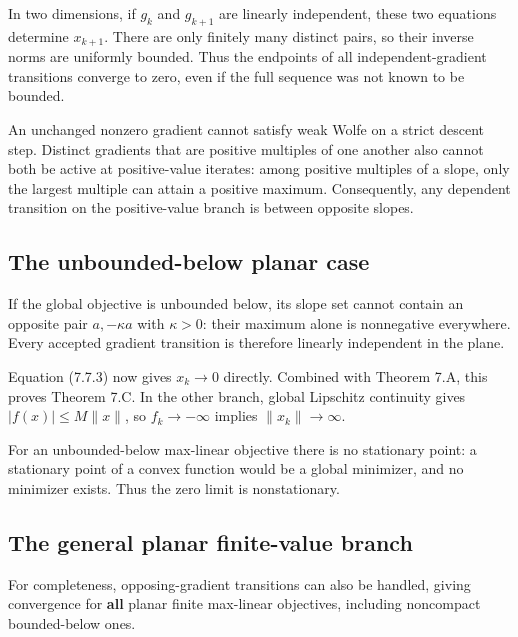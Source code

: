 In two dimensions, if \(g_k\) and \(g_{k+1}\) are linearly independent,
these two equations determine \(x_{k+1}\). There are only finitely many
distinct pairs, so their inverse norms are uniformly bounded. Thus the
endpoints of all independent-gradient transitions converge to zero, even
if the full sequence was not known to be bounded.

An unchanged nonzero gradient cannot satisfy weak Wolfe on a strict
descent step. Distinct gradients that are positive multiples of one
another also cannot both be active at positive-value iterates: among
positive multiples of a slope, only the largest multiple can attain a
positive maximum. Consequently, any dependent transition on the
positive-value branch is between opposite slopes.



\subsection{The unbounded-below planar
case}\label{H:the-unbounded-below-planar-case}

If the global objective is unbounded below, its slope set cannot contain
an opposite pair \(a,-\kappa a\) with \(\kappa>0\): their maximum alone
is nonnegative everywhere. Every accepted gradient transition is
therefore linearly independent in the plane.

Equation (7.7.3) now gives \(x_k\to0\) directly. Combined with Theorem 7.A,
this proves Theorem 7.C. In the other branch, global Lipschitz continuity
gives \(|f(x)|\le M\|x\|\), so \(f_k\to-\infty\) implies
\(\|x_k\|\to\infty\).

For an unbounded-below max-linear objective there is no stationary
point: a stationary point of a convex function would be a global
minimizer, and no minimizer exists. Thus the zero limit is
nonstationary.



\subsection{The general planar finite-value
branch}\label{H:the-general-planar-finite-value-branch}

For completeness, opposing-gradient transitions can also be handled,
giving convergence for \textbf{all} planar finite max-linear objectives,
including noncompact bounded-below ones.

